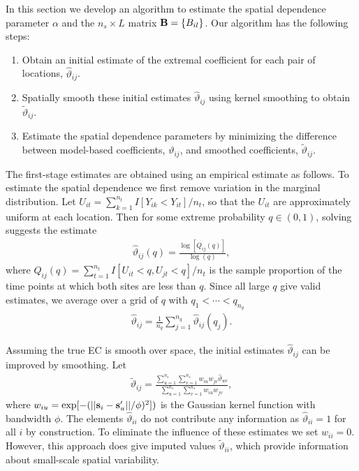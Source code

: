 \documentclass[11pt]{article}
\begin{document}
In this section we develop an algorithm to estimate the spatial dependence parameter $\alpha$ and the $n_s\times L$ matrix $\mbox{\bf B} = \{B_{il}\}$.
Our algorithm has the following steps:
\begin{enumerate}[(1)]
  \item Obtain an initial estimate of the extremal coefficient for each pair of locations, ${\hat \vartheta}_{ij}$.
  \item Spatially smooth these initial estimates ${\hat \vartheta}_{ij}$ using kernel smoothing to obtain ${\tilde \vartheta}_{ij}$.
  \item Estimate the spatial dependence parameters by minimizing the difference between model-based coefficients, $\vartheta_{ij}$, and smoothed coefficients, ${\tilde \vartheta}_{ij}$.
\end{enumerate}

The first-stage estimates are obtained using an empirical estimate as follows.
To estimate the spatial dependence we first remove variation in the marginal distribution.
Let $U_{it} = \sum_{k=1}^{n_t} I[Y_{ik}<Y_{it}]/n_t$, so that the $U_{it}$ are approximately uniform at each location.
Then for some extreme probability $q\in(0,1)$, solving  suggests the estimate
\begin{align}\label{ebeq:EChat0}
   {\hat \vartheta}_{ij}(q) = \frac{\log[Q_{ij}(q)]}{\log(q)},
\end{align}
where $Q_{ij}(q) = \sum_{t=1}^{n_t}I[U_{it}<q,U_{jt}<q]/n_t$ is the sample proportion of the time points at which both sites are less than $q$.
Since all large $q$ give valid estimates, we average over a grid of $q$ with $q_1< \cdots <q_{n_q}$
\begin{align} \label{ebeq:EChat1}
{\hat \vartheta}_{ij} = \frac{1}{n_q}\sum_{j=1}^{n_q}{\hat \vartheta}_{ij}(q_j).
\end{align}

Assuming the true EC is smooth over space, the initial estimates ${\hat \vartheta}_{ij}$ can be improved by smoothing.
Let
\begin{align} \label{ebeq:EChat2}
  {\tilde \vartheta}_{ij} = \frac{\displaystyle \sum_{u=1}^{n_s}\sum_{v=1}^{n_s} w_{iu}w_{jv}{\hat \vartheta}_{uv}}
  {\displaystyle \sum_{u=1}^{n_s}\sum_{v=1}^{n_s} w_{iu}w_{jv}},
\end{align}
where $w_{iu} = \exp[-(||\mbox{\bf s}_i-\mbox{\bf s}_u'||/\phi)^2])$ is the Gaussian kernel function with bandwidth $\phi$.
The elements ${\hat \vartheta}_{ii}$ do not contribute any information as ${\hat \vartheta}_{ii}=1$ for all $i$ by construction.
To eliminate the influence of these estimates we set $w_{ii}=0$.
However, this approach does give imputed values ${\tilde \vartheta}_{ii}$, which provide information about small-scale spatial variability.
\end{document}
